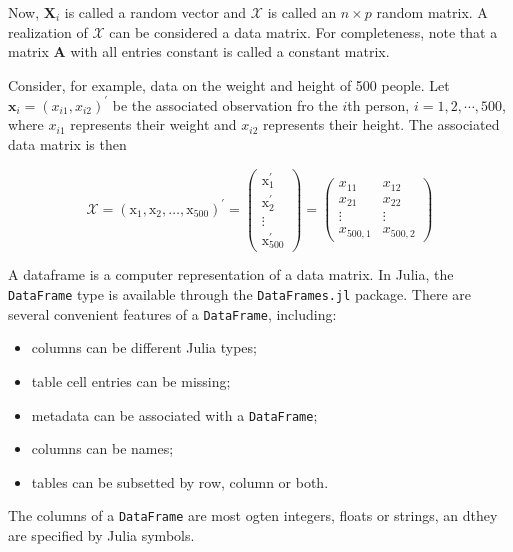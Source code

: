 \documentclass[11pt]{article}
\providecommand{\tightlist}{%
      \setlength{\itemsep}{0pt}\setlength{\parskip}{0pt}}
\begin{document}
Now, \(\mathbf{X}_i\) is called a random vector and \(\mathscr{X}\) is
called an \(n\times p\) random matrix. A realization of \(\mathscr{X}\)
can be considered a data matrix. For completeness, note that a matrix
\(\mathbf{A}\) with all entries constant is called a constant matrix.

Consider, for example, data on the weight and height of 500 people. Let
\(\mathbf{x}_i=(x_{i1},x_{i2})^{\prime}\) be the associated observation
fro the \(i\)th person, \(i=1,2,\cdots,500\), where \(x_{i1}\)
represents their weight and \(x_{i2}\) represents their height. The
associated data matrix is then

\begin{equation}
\mathscr{X}=\left(\mathrm{x}_{1}, \mathrm{x}_{2}, \ldots, \mathrm{x}_{500}\right)^{\prime}=\left(\begin{array}{c}{\mathrm{x}_{1}^{\prime}} \\ {\mathrm{x}_{2}^{\prime}} \\ {\vdots} \\ {\mathrm{x}_{500}^{\prime}}\end{array}\right)=\left(\begin{array}{cc}{x_{11}} & {x_{12}} \\ {x_{21}} & {x_{22}} \\ {\vdots} & {\vdots} \\ {x_{500,1}} & {x_{500,2}}\end{array}\right)
\end{equation}

A dataframe is a computer representation of a data matrix. In Julia, the
\texttt{DataFrame} type is available through the \texttt{DataFrames.jl}
package. There are several convenient features of a \texttt{DataFrame},
including:

\begin{itemize}
\tightlist
\item
  columns can be different Julia types;
\item
  table cell entries can be missing;
\item
  metadata can be associated with a \texttt{DataFrame};
\item
  columns can be names;
\item
  tables can be subsetted by row, column or both.
\end{itemize}

The columns of a \texttt{DataFrame} are most ogten integers, floats or
strings, an dthey are specified by Julia symbols.
\end{document}
